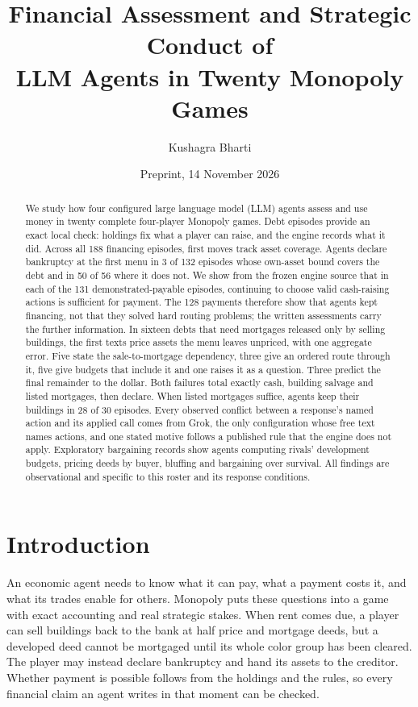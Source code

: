 \documentclass[10pt,twocolumn,letterpaper]{article}
\title{\vspace{-0.6em}Financial Assessment and Strategic Conduct of\\LLM Agents in Twenty Monopoly Games}
\author{Kushagra Bharti}
\date{Preprint, 14 November 2026}
\begin{document}

\maketitle

\begin{abstract}
We study how four configured large language model (LLM) agents assess and use money in twenty complete four-player Monopoly games. Debt episodes provide an exact local check: holdings fix what a player can raise, and the engine records what it did. Across all 188 financing episodes, first moves track asset coverage. Agents declare bankruptcy at the first menu in 3 of 132 episodes whose own-asset bound covers the debt and in 50 of 56 where it does not. We show from the frozen engine source that in each of the 131 demonstrated-payable episodes, continuing to choose valid cash-raising actions is sufficient for payment. The 128 payments therefore show that agents kept financing, not that they solved hard routing problems; the written assessments carry the further information. In sixteen debts that need mortgages released only by selling buildings, the first texts price assets the menu leaves unpriced, with one aggregate error. Five state the sale-to-mortgage dependency, three give an ordered route through it, five give budgets that include it and one raises it as a question. Three predict the final remainder to the dollar. Both failures total exactly cash, building salvage and listed mortgages, then declare. When listed mortgages suffice, agents keep their buildings in 28 of 30 episodes. Every observed conflict between a response's named action and its applied call comes from Grok, the only configuration whose free text names actions, and one stated motive follows a published rule that the engine does not apply. Exploratory bargaining records show agents computing rivals' development budgets, pricing deeds by buyer, bluffing and bargaining over survival. All findings are observational and specific to this roster and its response conditions.
\end{abstract}

\section{Introduction}
An economic agent needs to know what it can pay, what a payment costs it, and what its trades enable for others. Monopoly puts these questions into a game with exact accounting and real strategic stakes. When rent comes due, a player can sell buildings back to the bank at half price and mortgage deeds, but a developed deed cannot be mortgaged until its whole color group has been cleared. The player may instead declare bankruptcy and hand its assets to the creditor. Whether payment is possible follows from the holdings and the rules, so every financial claim an agent writes in that moment can be checked.
\end{document}
